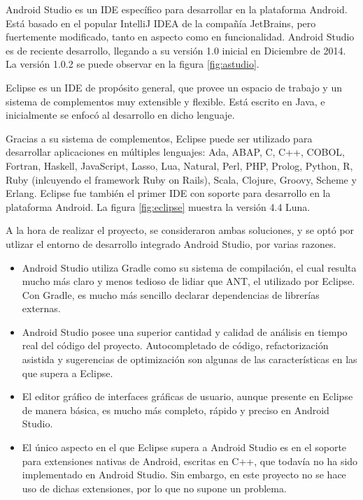     Android Studio es un \ac{IDE} específico para desarrollar en la plataforma Android. Está basado en el popular IntelliJ IDEA de la compañía JetBrains, pero fuertemente modificado, tanto en aspecto como en funcionalidad. Android Studio es de reciente desarrollo, llegando a su versión 1.0 inicial en Diciembre de 2014. La versión 1.0.2 se puede observar en la figura \ref{fig:astudio}.

    Eclipse es un \ac{IDE} de propósito general, que provee un espacio de trabajo y un sistema de complementos muy extensible y flexible. Está escrito en Java, e inicialmente se enfocó al desarrollo en dicho lenguaje. 
    
    Gracias a su sistema de complementos, Eclipse puede ser utilizado para desarrollar aplicaciones en múltiples lenguajes: Ada, ABAP, C, C++, COBOL, Fortran, Haskell, JavaScript, Lasso, Lua, Natural, Perl, PHP, Prolog, Python, R, Ruby (inlcuyendo el framework Ruby on Rails), Scala, Clojure, Groovy, Scheme y Erlang. Eclipse fue también el primer \ac{IDE} con soporte para desarrollo en la plataforma Android. La figura \ref{fig:eclipse} muestra la versión 4.4 Luna.

    A la hora de realizar el proyecto, se consideraron ambas soluciones, y se optó por utlizar el entorno de desarrollo integrado Android Studio, por varias razones.
\begin{itemize}
\item Android Studio utiliza Gradle como su sistema de compilación, el cual resulta mucho más claro y menos tedioso de lidiar que ANT, el utilizado por Eclipse. Con Gradle, es mucho más sencillo declarar dependencias de librerías externas. 

\item Android Studio posee una superior cantidad y calidad de análisis en tiempo real del código del proyecto. Autocompletado de código, refactorización asistida y sugerencias de optimización son algunas de las características en las que supera a Eclipse.

\item El editor gráfico de interfaces gráficas de usuario, aunque presente en Eclipse de manera básica, es mucho más completo, rápido y preciso en Android Studio.

\item El único aspecto en el que Eclipse supera a Android Studio es en el soporte para extensiones nativas de Android, escritas en C++, que todavía no ha sido implementado en Android Studio. Sin embargo, en este proyecto no se hace uso de dichas extensiones, por lo que no supone un problema.

\end{itemize}

